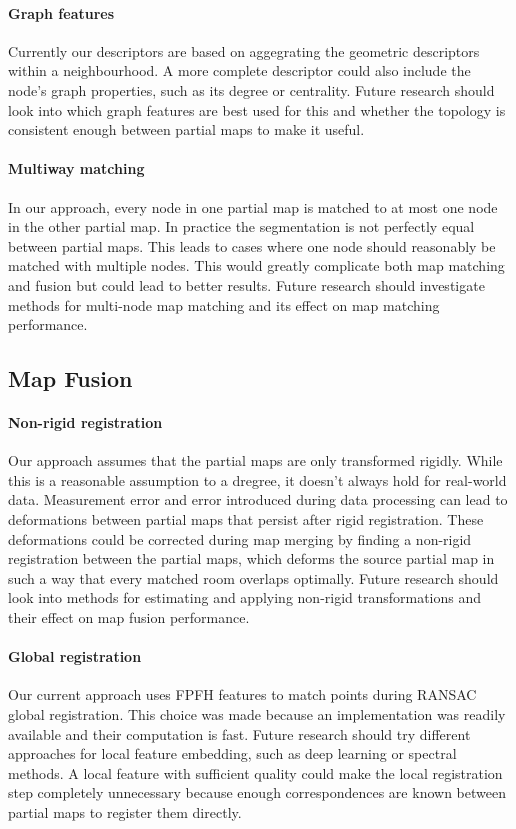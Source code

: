 \paragraph{Graph features}
Currently our descriptors are based on aggegrating the geometric descriptors within a neighbourhood. A more complete descriptor could also include the node's graph properties, such as its degree or centrality. Future research should look into which graph features are best used for this and whether the topology is consistent enough between partial maps to make it useful.

\paragraph{Multiway matching}
In our approach, every node in one partial map is matched to at most one node in the other partial map. In practice the segmentation is not perfectly equal between partial maps. This leads to cases where one node should reasonably be matched with multiple nodes. This would greatly complicate both map matching and fusion but could lead to better results. Future research should investigate methods for multi-node map matching and its effect on map matching performance.

\subsection{Map Fusion}

\paragraph{Non-rigid registration}
Our approach assumes that the partial maps are only transformed rigidly. While this is a reasonable assumption to a dregree, it doesn't always hold for real-world data. Measurement error and error introduced during data processing can lead to deformations between partial maps that persist after rigid registration. These deformations could be corrected during map merging by finding a non-rigid registration between the partial maps, which deforms the source partial map in such a way that every matched room overlaps optimally. Future research should look into methods for estimating and applying non-rigid transformations and their effect on map fusion performance.

\paragraph{Global registration}
Our current approach uses FPFH features to match points during RANSAC global registration. This choice was made because an implementation was readily available and their computation is fast. Future research should try different approaches for local feature embedding, such as deep learning or spectral methods. A local feature with sufficient quality could make the local registration step completely unnecessary because enough correspondences are known between partial maps to register them directly.



\pagebreak

